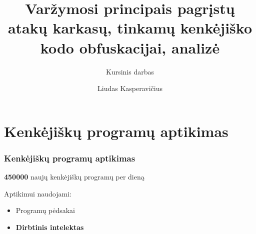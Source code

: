 \documentclass[12pt]{beamer}
\title[]{Varžymosi principais pagrįstų atakų karkasų, tinkamų kenkėjiško kodo obfuskacijai, analizė}
\subtitle[]{Kursinis darbas}
\author[Liudas Kasperavičius]{Liudas Kasperavičius}
\date{}
\begin{document}
\begin{frame}
    \titlepage
\end{frame}

\section{Kenkėjiškų programų aptikimas}
\begin{frame}
    \frametitle{Kenkėjiškų programų aptikimas}
    \begin{center}
        \huge\textbf{450000} naujų kenkėjiškų programų per dieną \large{\cite{MalwareStatisticsTrendsa}}
    \end{center}\pause

    \vspace{40pt}
    Aptikimui naudojami:
    \begin{itemize}
        \item Programų pėdsakai\pause
        \item \textbf{Dirbtinis intelektas}
    \end{itemize}
\end{frame}
\end{document}
